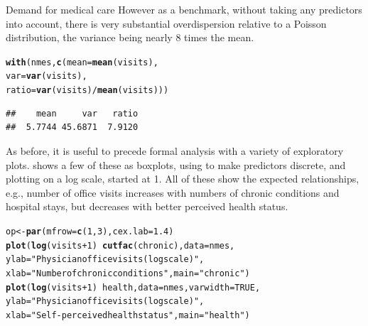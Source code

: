 \documentclass[11pt]{book}\usepackage[]{graphicx}\usepackage[]{color}
\makeatletter
\newcommand{\hlnum}[1]{\textcolor[rgb]{0.686,0.059,0.569}{#1}}%
\newcommand{\hlstr}[1]{\textcolor[rgb]{0.192,0.494,0.8}{#1}}%
\newcommand{\hlopt}[1]{\textcolor[rgb]{0,0,0}{#1}}%
\newcommand{\hlstd}[1]{\textcolor[rgb]{0.345,0.345,0.345}{#1}}%
\newcommand{\hlkwb}[1]{\textcolor[rgb]{0.69,0.353,0.396}{#1}}%
\newcommand{\hlkwc}[1]{\textcolor[rgb]{0.333,0.667,0.333}{#1}}%
\newcommand{\hlkwd}[1]{\textcolor[rgb]{0.737,0.353,0.396}{\textbf{#1}}}%
\newenvironment{kframe}{%
 \def\at@end@of@kframe{}%
 \ifinner\ifhmode%
  \def\at@end@of@kframe{\end{minipage}}%
  \begin{minipage}{\columnwidth}%
 \fi\fi%
 \def\FrameCommand##1{\hskip\@totalleftmargin \hskip-\fboxsep
 \colorbox{shadecolor}{##1}\hskip-\fboxsep
     \hskip-\linewidth \hskip-\@totalleftmargin \hskip\columnwidth}%
 \MakeFramed {\advance\hsize-\width
   \@totalleftmargin\z@ \linewidth\hsize
   \@setminipage}}%
 {\par\unskip\endMakeFramed%
 \at@end@of@kframe}
\newenvironment{knitrout}{}{} %
\renewenvironment{knitrout}{\small\renewcommand{\baselinestretch}{.85}}{} %
\makeatother
\begin{document}
\begin{Example}[nmes1]{Demand for medical care}
\begin{knitrout}
\end{knitrout}
However as a benchmark, without taking any predictors into account, there is very substantial
overdispersion relative to a Poisson distribution, the variance being nearly 8 times the mean.
\begin{knitrout}
\color{fgcolor}\begin{kframe}
\begin{alltt}
\hlkwd{with}\hlstd{(nmes,}  \hlkwd{c}\hlstd{(}\hlkwc{mean}\hlstd{=}\hlkwd{mean}\hlstd{(visits),}
              \hlkwc{var}\hlstd{=}\hlkwd{var}\hlstd{(visits),}
              \hlkwc{ratio}\hlstd{=}\hlkwd{var}\hlstd{(visits)}\hlopt{/}\hlkwd{mean}\hlstd{(visits)))}
\end{alltt}
\begin{verbatim}
##    mean     var   ratio 
##  5.7744 45.6871  7.9120
\end{verbatim}
\end{kframe}
\end{knitrout}
As before, it is useful to precede formal analysis with a variety of exploratory plots.
 shows a few of these as boxplots, using  to make
predictors discrete, and plotting  on a log scale, started at 1.
All of these show the expected relationships, e.g., number of office
visits increases with numbers of chronic conditions and hospital stays,
but decreases with better perceived health status.
\begin{knitrout}
\color{fgcolor}\begin{kframe}
\begin{alltt}
\hlstd{op} \hlkwb{<-}\hlkwd{par}\hlstd{(}\hlkwc{mfrow}\hlstd{=}\hlkwd{c}\hlstd{(}\hlnum{1}\hlstd{,} \hlnum{3}\hlstd{),} \hlkwc{cex.lab}\hlstd{=}\hlnum{1.4}\hlstd{)}
\hlkwd{plot}\hlstd{(}\hlkwd{log}\hlstd{(visits}\hlopt{+}\hlnum{1}\hlstd{)} \hlopt{~} \hlkwd{cutfac}\hlstd{(chronic),} \hlkwc{data} \hlstd{= nmes,}
     \hlkwc{ylab} \hlstd{=} \hlstr{"Physician office visits (log scale)"}\hlstd{,}
     \hlkwc{xlab} \hlstd{=} \hlstr{"Number of chronic conditions"}\hlstd{,} \hlkwc{main} \hlstd{=} \hlstr{"chronic"}\hlstd{)}
\hlkwd{plot}\hlstd{(}\hlkwd{log}\hlstd{(visits}\hlopt{+}\hlnum{1}\hlstd{)} \hlopt{~} \hlstd{health,} \hlkwc{data} \hlstd{= nmes,} \hlkwc{varwidth} \hlstd{=} \hlnum{TRUE}\hlstd{,}
     \hlkwc{ylab} \hlstd{=} \hlstr{"Physician office visits (log scale)"}\hlstd{,}
     \hlkwc{xlab} \hlstd{=} \hlstr{"Self-perceived health status"}\hlstd{,} \hlkwc{main} \hlstd{=} \hlstr{"health"}\hlstd{)}

\end{alltt}
\end{kframe}
\end{knitrout}
\end{Example}
\end{document}
